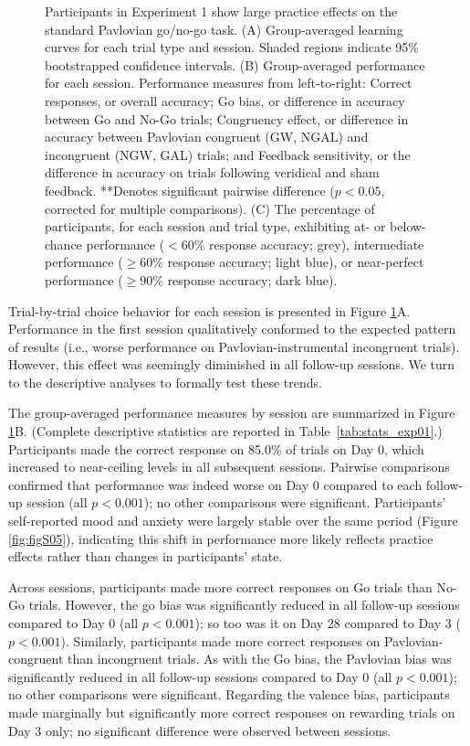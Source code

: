 \documentclass[a4paper,12pt]{article}
\begin{document}
\begin{refsection}[main]
\begin{figure}[hpt]
    \centerline{}
    \caption{Participants in Experiment 1 show large practice effects on the standard Pavlovian go/no-go task. (A) Group-averaged learning curves for each trial type and session. Shaded regions indicate 95\% bootstrapped confidence intervals. (B) Group-averaged performance for each session. Performance measures from left-to-right: Correct responses, or overall accuracy; Go bias, or difference in accuracy between Go and No-Go trials; Congruency effect, or difference in accuracy between Pavlovian congruent (GW, NGAL) and incongruent (NGW, GAL) trials; and Feedback sensitivity, or the difference in accuracy on trials following veridical and sham feedback. **Denotes significant pairwise difference ($p < 0.05$, corrected for multiple comparisons). (C) The percentage of participants, for each session and trial type, exhibiting at- or below-chance performance ($< 60\%$ response accuracy; grey), intermediate performance ($\geq 60\%$ response accuracy; light blue), or near-perfect performance ($\geq 90\%$ response accuracy; dark blue).}
    \label{fig:exp01_behavior}
\end{figure}

Trial-by-trial choice behavior for each session is presented in Figure \ref{fig:exp01_behavior}A. Performance in the first session qualitatively conformed to the expected pattern of results (i.e., worse performance on Pavlovian-instrumental incongruent trials). However, this effect was seemingly diminished in all follow-up sessions. We turn to the descriptive analyses to formally test these trends. 

The group-averaged performance measures by session are summarized in Figure \ref{fig:exp01_behavior}B. (Complete descriptive statistics are reported in Table~\ref{tab:stats_exp01}.) Participants made the correct response on 85.0\% of trials on Day 0, which increased to near-ceiling levels in all subsequent sessions. Pairwise comparisons confirmed that performance was indeed worse on Day 0 compared to each follow-up session (all $p < 0.001$); no other comparisons were significant. Participants' self-reported mood and anxiety were largely stable over the same period (Figure \ref{fig:figS05}), indicating this shift in performance more likely reflects practice effects rather than changes in participants' state. 

Across sessions, participants made more correct responses on Go trials than No-Go trials. However, the go bias was significantly reduced in all follow-up sessions compared to Day 0 (all $p < 0.001$); so too was it on Day 28 compared to Day 3 ($p < 0.001$). Similarly, participants made more correct responses on Pavlovian-congruent than incongruent trials. As with the Go bias, the Pavlovian bias was significantly reduced in all follow-up sessions compared to Day 0 (all $p < 0.001$); no other comparisons were significant. Regarding the valence bias, participants made marginally but significantly more correct responses on rewarding trials on Day 3 only; no significant difference were observed between sessions.


\end{refsection}
\end{document}
